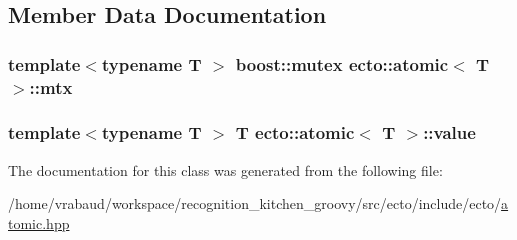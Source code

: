 \subsection{\-Member \-Data \-Documentation}
\hypertarget{classecto_1_1atomic_a52a121e21f9449371998dbccaca0cbde}{
\subsubsection[{mtx}]{\setlength{\rightskip}{0pt plus 5cm}template$<$typename T $>$ boost\-::mutex {\bf ecto\-::atomic}$<$ \-T $>$\-::{\bf mtx}}}\label{classecto_1_1atomic_a52a121e21f9449371998dbccaca0cbde}
\hypertarget{classecto_1_1atomic_ac5ba45af623c7bc47e6918e290e39c67}{
\subsubsection[{value}]{\setlength{\rightskip}{0pt plus 5cm}template$<$typename T $>$ \-T {\bf ecto\-::atomic}$<$ \-T $>$\-::{\bf value}}}\label{classecto_1_1atomic_ac5ba45af623c7bc47e6918e290e39c67}


\-The documentation for this class was generated from the following file\-:\begin{DoxyCompactItemize}
\item 
/home/vrabaud/workspace/recognition\-\_\-kitchen\-\_\-groovy/src/ecto/include/ecto/\hyperlink{atomic_8hpp}{atomic.\-hpp}\end{DoxyCompactItemize}
